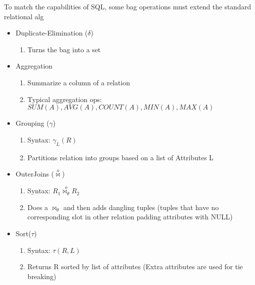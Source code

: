 \documentclass[11pt]{article}
\begin{document}
    To match the capabilities of SQL, some bag operations must extend
    the standard relational alg
\begin{itemize}

\item Duplicate-Elimination ($\delta$)\\
\label{sec-4.9.2.1}

\begin{enumerate}
\item Turns the bag into a set
\end{enumerate}

\item Aggregation\\
\label{sec-4.9.2.2}

\begin{enumerate}
\item Summarize a column of a relation
\item Typical aggregation ops: $SUM(A), AVG(A), COUNT(A), MIN(A), MAX(A)$
\end{enumerate}

\item Grouping ($\gamma$)\\
\label{sec-4.9.2.3}

\begin{enumerate}
\item Syntax: $\gamma_L(R)$
\item Partitions relation into groups based on a list of Attributes L
\end{enumerate}

\item OuterJoins ($\stackrel{o}{\bowtie}$)\\
\label{sec-4.9.2.4}

\begin{enumerate}
\item Syntax: $R_1 \stackrel{o}{\bowtie_\theta} R_2$
\item Does a $\bowtie_\theta$ and then adds dangling tuples (tuples
        that have no corresponding slot in other relation padding
        attributes with NULL)
\end{enumerate}

\item Sort($\tau$)\\
\label{sec-4.9.2.5}

\begin{enumerate}
\item Syntax: $\tau(R,L)$
\item Returns R sorted by list of attributes (Extra attributes are
        used for tie breaking)
\end{enumerate}
\end{itemize} %
\end{document}
